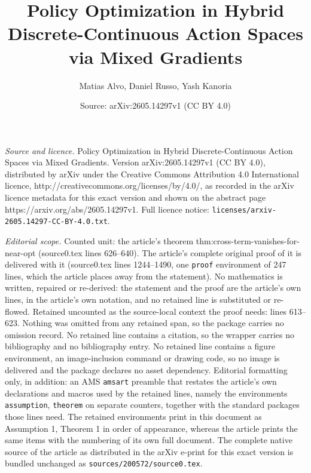 \documentclass[10pt,a4paper]{amsart}
\title{Policy Optimization in Hybrid Discrete-Continuous Action Spaces via Mixed Gradients}
\author{Matias Alvo, Daniel Russo, Yash Kanoria}
\date{Source: arXiv:2605.14297v1 (CC BY 4.0)}
\begin{document}
\maketitle

\noindent\emph{Source and licence.} Policy Optimization in Hybrid Discrete-Continuous Action Spaces via Mixed Gradients. Version arXiv:2605.14297v1 (CC BY 4.0), distributed by arXiv under the Creative Commons Attribution 4.0 International licence, http://creativecommons.org/licenses/by/4.0/, as recorded in the arXiv licence metadata for this exact version and shown on the abstract page https://arxiv.org/abs/2605.14297v1. Full licence notice: \texttt{licenses/arxiv-2605.14297-CC-BY-4.0.txt}.\par\smallskip

\noindent\textit{Editorial scope.} Counted unit: the article's theorem thm:cross-term-vanishes-for-near-opt (source0.tex lines 626--640). The article's complete original proof of it is delivered with it (source0.tex lines 1244--1490, one \texttt{proof} environment of 247 lines, which the article places away from the statement). No mathematics is written, repaired or re-derived: the statement and the proof are the article's own lines, in the article's own notation, and no retained line is substituted or re-flowed.  Retained uncounted as the source-local context the proof needs: lines 613--623.  Nothing was omitted from any retained span, so the package carries no omission record.  No retained line contains a citation, so the wrapper carries no bibliography and no bibliography entry.  No retained line contains a figure environment, an image-inclusion command or drawing code, so no image is delivered and the package declares no asset dependency.  Editorial formatting only, in addition: an AMS \texttt{amsart} preamble that restates the article's own declarations and macros used by the retained lines, namely the environments \texttt{assumption}, \texttt{theorem} on separate counters, together with the standard packages those lines need.  The retained environments print in this document as Assumption 1, Theorem 1 in order of appearance, whereas the article prints the same items with the numbering of its own full document.  The complete native source of the article as distributed in the arXiv e-print for this exact version is bundled unchanged as \texttt{sources/200572/source0.tex}.
\end{document}
